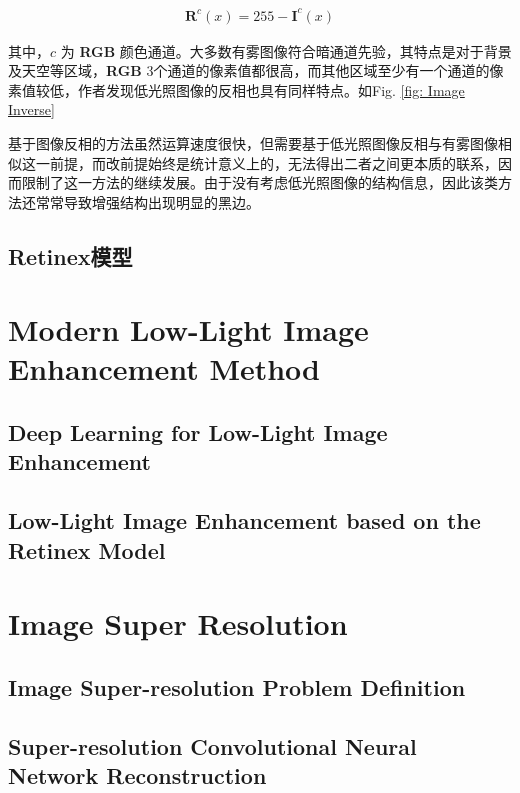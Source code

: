 \documentclass[letterpaper,10pt]{article}
\begin{document}
		\begin{equation}
			\begin{aligned}
				\mathbf{R}^c (x) = 255 - \mathbf{I}^c(x)
			\end{aligned}
			\label{eq: Image Reverse}
		\end{equation}
		
		其中，$c$ 为 \textbf{RGB} 颜色通道。大多数有雾图像符合暗通道先验，其特点是对于背景及天空等区域，\textbf{RGB} 3个通道的像素值都很高，而其他区域至少有一个通道的像素值较低，作者发现低光照图像的反相也具有同样特点。如Fig. \ref{fig: Image Inverse}
		
		基于图像反相的方法虽然运算速度很快，但需要基于低光照图像反相与有雾图像相似这一前提，而改前提始终是统计意义上的，无法得出二者之间更本质的联系，因而限制了这一方法的继续发展。由于没有考虑低光照图像的结构信息，因此该类方法还常常导致增强结构出现明显的黑边。
		
		\subsection{Retinex模型}
		
		
	
	\section{Modern Low-Light Image Enhancement Method}
		
		\subsection{Deep Learning for Low-Light Image Enhancement}
	
		\subsection{Low-Light Image Enhancement based on the Retinex Model}
		
	
	\section{Image Super Resolution}
	
		\subsection{Image Super-resolution Problem Definition}
		
		\subsection{Super-resolution Convolutional Neural Network Reconstruction}
		
\end{document}
